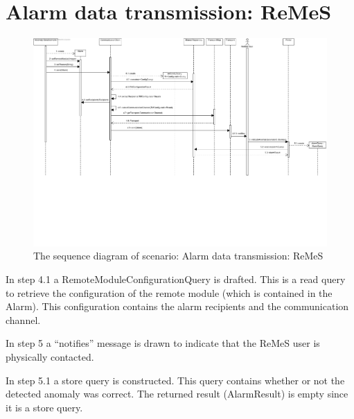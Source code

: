 \section{Alarm data transmission: ReMeS}

\begin{figure}[H]
	\begin{centering}
		\includegraphics[width=\textwidth]{figs/scenario-5-10.pdf}
		\caption{The sequence diagram of scenario: Alarm data transmission: ReMeS}
		\label{fig:scenario-5-10}
	\end{centering}
\end{figure}

\npar In step 4.1 a RemoteModuleConfigurationQuery is drafted. This is a read
query to retrieve the configuration of the remote module (which is contained in
the Alarm). This configuration contains the alarm recipients and the
communication channel.

\npar In step 5 a ``notifies'' message is drawn to indicate that the ReMeS user
is physically contacted.

\npar In step 5.1 a store query is constructed. This query contains whether or
not the detected anomaly was correct. The returned result (AlarmResult) is empty
since it is a store query.

